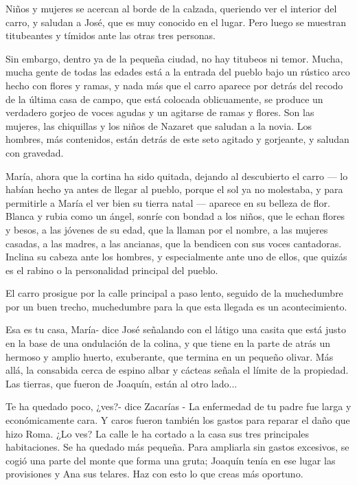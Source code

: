 \documentclass[12pt]{book} %
\begin{document}
Niños y mujeres se acercan al borde de la calzada, queriendo ver el interior del carro, y saludan a José, que es muy conocido en el lugar. Pero luego se muestran titubeantes y tímidos ante las otras tres personas. 

Sin embargo, dentro ya de la pequeña ciudad, no hay titubeos ni temor. Mucha, mucha gente de todas las edades está a la entrada del pueblo bajo un rústico arco hecho con flores y ramas, y nada más que el carro aparece por detrás del recodo de la última casa de campo, que está colocada oblicuamente, se produce un verdadero gorjeo de voces agudas y un agitarse de ramas y flores. Son las mujeres, las chiquillas y los niños de Nazaret que saludan a la novia. Los hombres, más contenidos, están detrás de este seto agitado y gorjeante, y saludan con gravedad. 

María, ahora que la cortina ha sido quitada, dejando al descubierto el carro — lo habían hecho ya antes de llegar al pueblo, porque el sol ya no molestaba, y para permitirle a María el ver bien su tierra natal — aparece en su belleza de flor. Blanca y rubia como un ángel, sonríe con bondad a los niños, que le echan flores y besos, a las jóvenes de su edad, que la llaman por el nombre, a las mujeres casadas, a las madres, a las ancianas, que la bendicen con sus voces cantadoras. Inclina su cabeza ante los hombres, y especialmente ante uno de ellos, que quizás es el rabino o la personalidad principal del pueblo. 

El carro prosigue por la calle principal a paso lento, seguido de la muchedumbre por un buen trecho, muchedumbre para la que esta llegada es un acontecimiento. 

Esa es tu casa, María- dice José señalando con el látigo una casita que está justo en la base de una ondulación de la colina, y que tiene en la parte de atrás un hermoso y amplio huerto, exuberante, que termina en un pequeño olivar. Más allá, la consabida cerca de espino albar y cácteas señala el límite de la propiedad. Las tierras, que fueron de Joaquín, están al otro lado... 

Te ha quedado poco, ¿ves?- dice Zacarías - La enfermedad de tu padre fue larga y económicamente cara. Y caros fueron también los gastos para reparar el daño que hizo Roma. ¿Lo ves? La calle le ha cortado a la casa sus tres principales habitaciones. Se ha quedado más pequeña. Para ampliarla sin gastos excesivos, se cogió una parte del monte que forma una gruta; Joaquín tenía en ese lugar las provisiones y Ana sus telares. Haz con esto lo que creas más oportuno. 
\end{document}
